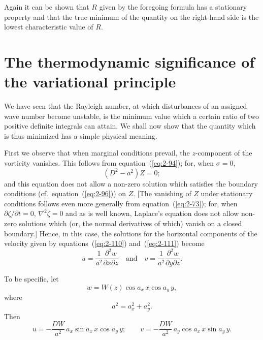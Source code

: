 Again it can be shown that $R$ given by the foregoing formula has a
stationary property and that the true minimum of the quantity on the
right-hand side is the lowest characteristic value of $R$.

\section{The thermodynamic significance of the variational principle}\label{sec:14}

We have seen that the Rayleigh number, at which disturbances of an
assigned wave number become unstable, is the minimum value which a
certain ratio of two positive definite integrals can attain. We shall now
show that the quantity which is thus minimized has a simple physical
meaning.

First we observe that when marginal conditions prevail, the $z$-component of the vorticity vanishes. This follows from equation~(\ref{eq:2-94}); for,
when $\sigma = 0$,
\begin{equation}
\label{eq:2-171}
(D^2-a^2)Z = 0;
\end{equation}
and this equation does not allow a non-zero solution which satisfies the
boundary conditions (cf.\ equation~(\ref{eq:2-96})) on $Z$. [The vanishing of $Z$ under
stationary conditions follows even more generally from equation~(\ref{eq:2-73});
for, when $\partial\zeta/\partial t = 0$, $\nabla^2\zeta = 0$ and as is well known, Laplace's equation
does not allow non-zero solutions which (or, the normal derivatives of
which) vanish on a closed boundary.] Hence, in this case, the solutions
for the horizontal components of the velocity given by equations~(\ref{eq:2-110})
and~(\ref{eq:2-111}) become
\begin{equation}
\label{eq:2-172}
u = \frac{1}{a^2}\frac{\partial^2 w}{\partial x\partial z} \quad\text{and}\quad v = \frac{1}{a^2}\frac{\partial^2 w}{\partial y\partial z}.
\end{equation}

To be specific, let
\begin{equation}
\label{eq:2-173}
w = W(z)\cos a_x\,x\cos a_y\,y,
\end{equation}
where
\begin{equation}
\label{eq:2-174}
a^2 = a_x^2+a_y^2.
\end{equation}
Then
\begin{equation}
\label{eq:2-175}
u = -\frac{DW}{a^2}\,a_x\sin a_x\,x\cos a_y\,y; \qquad v = -\frac{DW}{a^2}\,a_y\cos a_x\,x\sin a_y\,y.
\end{equation}

